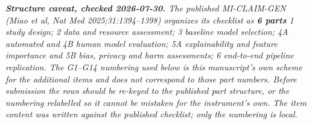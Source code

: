 \documentclass[10pt]{article}
\begin{document}
\vspace{4pt}
{\footnotesize\itshape \textbf{Structure caveat, checked 2026-07-30.} The published
MI-CLAIM-GEN (Miao et al, \textit{Nat Med} 2025;31:1394--1398) organizes its
checklist as \textbf{6 parts} \textemdash{} 1 study design; 2 data and resource
assessment; 3 baseline model selection; 4A automated and 4B human model evaluation;
5A explainability and feature importance and 5B bias, privacy and harm assessments;
6 end-to-end pipeline replication. The G1--G14 numbering used below is this
manuscript's own scheme for the additional items and does \emph{not} correspond to
those part numbers. Before submission the rows should be re-keyed to the published
part structure, or the numbering relabelled so it cannot be mistaken for the
instrument's own. The item \emph{content} was written against the published
checklist; only the numbering is local.\par}
\end{document}
